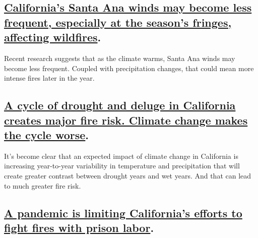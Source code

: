 \hypertarget{californias-santa-ana-winds-may-become-less-frequent-especially-at-the-seasons-fringes-affecting-wildfires}{%
\subsection{\texorpdfstring{\href{https://www.nytimes3xbfgragh.onion/2019/10/28/climate/santa-ana-winds.html}{California's
Santa Ana winds may become less frequent, especially at the season's
fringes, affecting
wildfires}.}{California's Santa Ana winds may become less frequent, especially at the season's fringes, affecting wildfires.}}\label{californias-santa-ana-winds-may-become-less-frequent-especially-at-the-seasons-fringes-affecting-wildfires}}

Recent research suggests that as the climate warms, Santa Ana winds may
become less frequent. Coupled with precipitation changes, that could
mean more intense fires later in the year.

\hypertarget{a-cycle-of-drought-and-deluge-in-california-creates-major-fire-risk-climate-change-makes-the-cycle-worse}{%
\subsection{\texorpdfstring{\href{https://www.nytimes3xbfgragh.onion/2017/12/07/climate/california-fires-warming.html}{A
cycle of drought and deluge in California creates major fire risk.
Climate change makes the cycle
worse}.}{A cycle of drought and deluge in California creates major fire risk. Climate change makes the cycle worse.}}\label{a-cycle-of-drought-and-deluge-in-california-creates-major-fire-risk-climate-change-makes-the-cycle-worse}}

It's become clear that an expected impact of climate change in
California is increasing year-to-year variability in temperature and
precipitation that will create greater contrast between drought years
and wet years. And that can lead to much greater fire risk.

\hypertarget{a-pandemic-is-limiting-californias-efforts-to-fight-fires-with-prison-labor}{%
\subsection{\texorpdfstring{\href{https://www.nytimes3xbfgragh.onion/2020/08/22/us/california-wildfires-prisoners.html}{A
pandemic is limiting California's efforts to fight fires with prison
labor}.}{A pandemic is limiting California's efforts to fight fires with prison labor.}}\label{a-pandemic-is-limiting-californias-efforts-to-fight-fires-with-prison-labor}}

